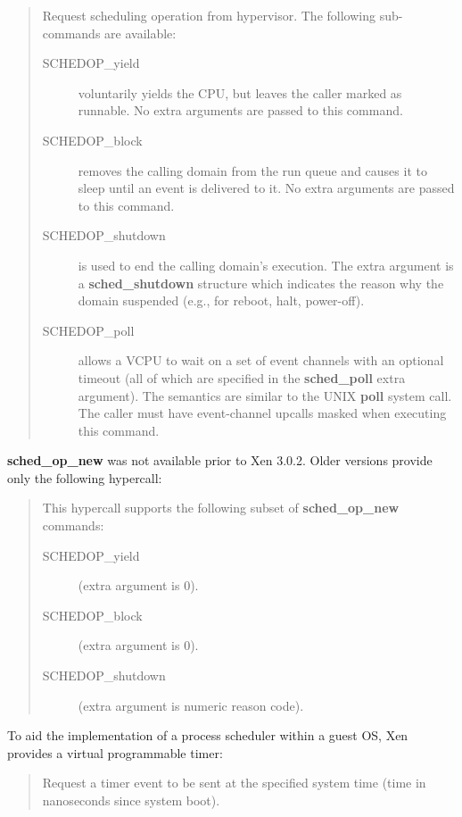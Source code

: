 \documentclass[11pt,twoside,final,openright]{report}
\newcommand{\hypercall}[1]{\vspace{2mm}{\sf #1}}
\begin{document}
\begin{quote} 
\hypercall{sched\_op\_new(int cmd, void *extra\_args)}

Request scheduling operation from hypervisor. The following
sub-commands are available:

\begin{description}
\item[SCHEDOP\_yield] voluntarily yields the CPU, but leaves the
caller marked as runnable. No extra arguments are passed to this
command. 
\item[SCHEDOP\_block] removes the calling domain from the run queue
and causes it to sleep until an event is delivered to it. No extra 
arguments are passed to this command. 
\item[SCHEDOP\_shutdown] is used to end the calling domain's
execution. The extra argument is a {\bf sched\_shutdown} structure
which indicates the reason why the domain suspended (e.g., for reboot,
halt, power-off).
\item[SCHEDOP\_poll] allows a VCPU to wait on a set of event channels
with an optional timeout (all of which are specified in the {\bf
sched\_poll} extra argument). The semantics are similar to the UNIX
{\bf poll} system call. The caller must have event-channel upcalls
masked when executing this command.
\end{description}
\end{quote} 

{\bf sched\_op\_new}  was not available prior to Xen 3.0.2. Older versions
provide only the following hypercall:

\begin{quote} 
\hypercall{sched\_op(int cmd, unsigned long extra\_arg)}

This hypercall supports the following subset of {\bf sched\_op\_new} commands:

\begin{description}
\item[SCHEDOP\_yield] (extra argument is 0).
\item[SCHEDOP\_block] (extra argument is 0).
\item[SCHEDOP\_shutdown] (extra argument is numeric reason code).
\end{description}
\end{quote}

To aid the implementation of a process scheduler within a guest OS,
Xen provides a virtual programmable timer:

\begin{quote}
\hypercall{set\_timer\_op(uint64\_t timeout)} 

Request a timer event to be sent at the specified system time (time 
in nanoseconds since system boot).

\end{quote} 
\end{document}
